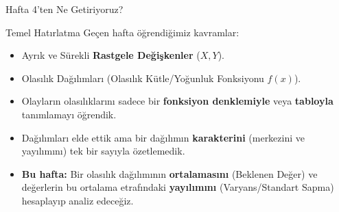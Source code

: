 ﻿\documentclass[light]{lutbeamer}
\begin{document}
\begin{frame}{Hafta 4'ten Ne Getiriyoruz?}
    \begin{block}{Temel Hatırlatma}
        Geçen hafta öğrendiğimiz kavramlar:
        \begin{itemize}
            \item Ayrık ve Sürekli \textbf{Rastgele Değişkenler} ($X, Y$).
            \item Olasılık Dağılımları (Olasılık Kütle/Yoğunluk Fonksiyonu $f(x)$).
            \item Olayların olasılıklarını sadece bir \textbf{fonksiyon denklemiyle} veya \textbf{tabloyla} tanımlamayı öğrendik.
        \end{itemize}
    \end{block}

    \begin{itemize}
        \item Dağılımları elde ettik ama bir dağılımın \textbf{karakterini} (merkezini ve yayılımını) tek bir sayıyla özetlemedik.
        \item \textbf{Bu hafta:} Bir olasılık dağılımının \textbf{ortalamasını} (Beklenen Değer) ve değerlerin bu ortalama etrafındaki \textbf{yayılımını} (Varyans/Standart Sapma) hesaplayıp analiz edeceğiz.
    \end{itemize}
\end{frame}
\end{document}
